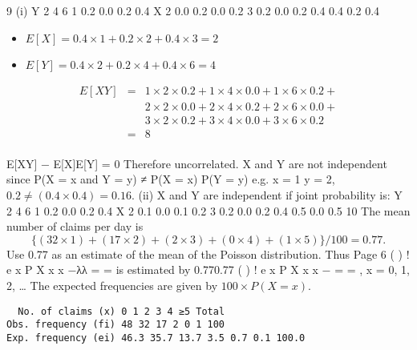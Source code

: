 \documentclass[a4paper,12pt]{article}
\begin{document}
9 (i)
Y
2 4 6
1 0.2 0.0 0.2 0.4
X 2 0.0 0.2 0.0 0.2
3 0.2 0.0 0.2 0.4
0.4 0.2 0.4
\begin{itemize}
    \item $E[X] = 0.4 \times 1 + 0.2 \times 2 + 0.4 \times 3 = 2$
\item $E[Y] = 0.4 \times 2 + 0.2 \times 4 + 0.4 \times 6 = 4$
\end{itemize}
\begin{eqnarray*}
E[XY] &=& 1 \times 2 \times 0.2 + 1 \times 4 \times 0.0 + 1 \times 6 \times 0.2
+ \\ & & 2 \times 2 \times 0.0 + 2 \times 4 \times 0.2 + 2 \times 6 \times 0.0
+ \\ & &  3 \times 2 \times 0.2 + 3 \times 4 \times 0.0 + 3 \times 6 \times 0.2 \\
&=&  8\\
\end{eqnarray*}

E[XY] − E[X]E[Y] = 0 Therefore uncorrelated.
X and Y are not independent since
P(X = x and Y = y) ≠ P(X = x) P(Y = y)
e.g. x = 1 y = 2, $0.2 \neq (0.4 \times 0.4) = 0.16$.
(ii) X and Y are independent if joint probability is:
Y
2 4 6
1 0.2 0.0 0.2 0.4
X 2 0.1 0.0 0.1 0.2
3 0.2 0.0 0.2 0.4
0.5 0.0 0.5
10 The mean number of claims per day is
\[\{(32 \times 1) + (17 \times 2) + (2 \times 3) + (0 \times 4) + (1 \times 5)\}/100 = 0.77.\]
Use 0.77 as an estimate of the mean of the Poisson distribution. Thus
Page 6
( )
!
e x P X x
x
−λλ
= = is estimated by
0.770.77 ( )
!
e x P X x
x
−
= = , x = 0, 1, 2, …
The expected frequencies are given by $100 \times P(X = x)$.
\begin{verbatim}
  No. of claims (x) 0 1 2 3 4 ≥5 Total
Obs. frequency (fi) 48 32 17 2 0 1 100
Exp. frequency (ei) 46.3 35.7 13.7 3.5 0.7 0.1 100.0  
\end{verbatim}
\end{document}
